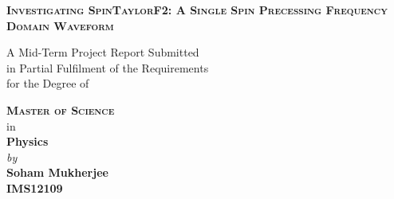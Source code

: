 \documentclass[12pt, a4wide]{report}
\theoremstyle{plain}
\theoremstyle{definition}
\theoremstyle{remark}
\begin{document}


\begin{titlepage}
\enlargethispage{10mm}
\begin{center}
\vspace*{-10mm}

\textbf{\textsc{\Large Investigating SpinTaylorF2: A Single Spin Precessing Frequency Domain Waveform}}\\

\vspace*{10mm}

A Mid-Term Project Report Submitted \\
in Partial Fulfilment of the Requirements  \\
for the Degree of  \\

\vspace{5mm}

\textbf{\textsc{\Large Master of Science}}\\
in \\
{\large \bf Physics} \\
\vspace{7mm}
{\textit{by}} \\ \vspace{2mm}
{\textbf{\large Soham Mukherjee}}\\
{\textbf{IMS12109}}\\

\vspace*{5.5mm}


\end{center}
\end{titlepage}
\end{document}
